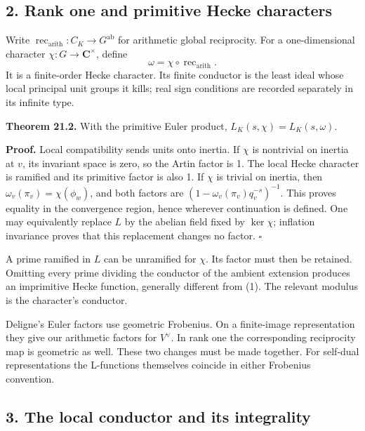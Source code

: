\documentclass[11pt,a4paper]{article}
\begin{document}
\subsection{2. Rank one and primitive Hecke
characters}\label{rank-one-and-primitive-hecke-characters}

Write \(\operatorname{rec}_{\mathrm{arith}}:C_K\to G^{\mathrm{ab}}\) for
arithmetic global reciprocity. For a one-dimensional character
\(\chi:G\to\mathbf C^\times\), define \[
\omega=\chi\circ\operatorname{rec}_{\mathrm{arith}}.
\tag{7}
\] It is a finite-order Hecke character. Its finite conductor is the
least ideal whose local principal unit groups it kills; real sign
conditions are recorded separately in its infinite type.

\textbf{Theorem 21.2.} With the primitive Euler product,
\(L_K(s,\chi)=L_K(s,\omega)\).

\textbf{Proof.} Local compatibility sends units onto inertia. If
\(\chi\) is nontrivial on inertia at \(v\), its invariant space is zero,
so the Artin factor is 1. The local Hecke character is ramified and its
primitive factor is also 1. If \(\chi\) is trivial on inertia, then
\(\omega_v(\pi_v)=\chi(\phi_w)\), and both factors are
\((1-\omega_v(\pi_v)q_v^{-s})^{-1}\). This proves equality in the
convergence region, hence wherever continuation is defined. One may
equivalently replace \(L\) by the abelian field fixed by \(\ker\chi\);
inflation invariance proves that this replacement changes no factor.
\(\square\)

A prime ramified in \(L\) can be unramified for \(\chi\). Its factor
must then be retained. Omitting every prime dividing the conductor of
the ambient extension produces an imprimitive Hecke function, generally
different from (1). The relevant modulus is the character's conductor.

Deligne's Euler factors use geometric Frobenius. On a finite-image
representation they give our arithmetic factors for \(V^\vee\). In rank
one the corresponding reciprocity map is geometric as well. These two
changes must be made together. For self-dual representations the
L-functions themselves coincide in either Frobenius convention.

\subsection{3. The local conductor and its
integrality}\label{the-local-conductor-and-its-integrality}
\end{document}
